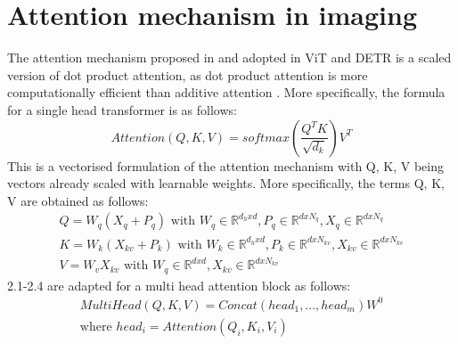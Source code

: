 \section{Attention mechanism in imaging}
The attention mechanism proposed in \cite{AttentionIsAllYouNeed} and adopted in ViT and DETR is a scaled version of dot product attention, as dot product attention is more computationally efficient than additive attention \cite{additiveAttention}. More specifically, the formula for a single head transformer is as follows: 
\begin{equation}
    Attention(Q, K, V ) = softmax(\frac{Q^{T}K}{\sqrt{d_{k}}})V^{T}
\end{equation}
This is a vectorised formulation of the attention mechanism with Q, K, V being vectors already scaled with learnable weights. More specifically, the terms Q, K, V are obtained as follows:
\begin{gather}
    Q = W_{q}(X_{q}+P_{q}) \text{ with } W_{q} \in \mathbb{R}^{d_hxd},  P_{q} \in \mathbb{R}^{dxN_q}, X_{q} \in \mathbb{R}^{dxN_q}\\
    K = W_{k}(X_{kv}+P_{k}) \text{ with } W_{k} \in \mathbb{R}^{d_hxd},  P_{k} \in \mathbb{R}^{dxN_{kv}}, X_{kv} \in \mathbb{R}^{dxN_{kv}} \\
    V = W_{v}X_{kv} \text{ with } W_{q} \in \mathbb{R}^{dxd},  X_{kv} \in \mathbb{R}^{dxN_{kv}}
\end{gather}
2.1-2.4 are adapted for a multi head attention block as follows: 
\begin{gather}
    MultiHead(Q, K, V) = Concat(head_{1}, ..., head_{m})W^{0} \\
    \text{where } head_{i} = Attention(Q_{i}, K_{i}, V_{i})
\end{gather}

